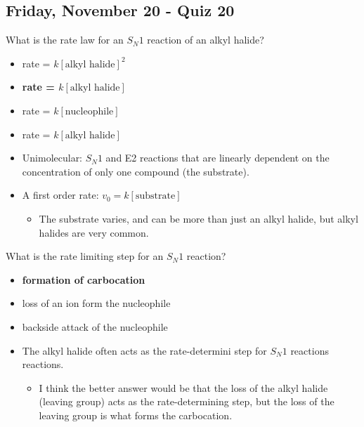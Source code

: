 \documentclass[12pt,a4paper]{article}
\begin{document}
\subsection{Friday, November 20 - Quiz 20}
\begin{enumerate}
    {\color{G-Moon}\item What is the rate law for an \(S_N1\) reaction of an alkyl halide?
    \begin{itemize}
        \item rate = \(k[\text{alkyl halide}]^2\)
        \item {\color{o-Sun}\textbf{ rate = \(k[\text{alkyl halide}]\)}}
        \item rate = \(k[\text{nucleophile}]\)
        \item rate = \(k[\text{alkyl halide}]\)
    \end{itemize}}
        \begin{itemize}
            \item Unimolecular: \(S_N1\) and E2 reactions that are linearly dependent on the concentration of only one compound (the substrate).
            \item A first order rate: \(v_0=k[\text{substrate}]\) 
                \begin{itemize}
                    \item The substrate varies, and can be more than just an alkyl halide, but alkyl halides are very common.
                \end{itemize}
        \end{itemize}
    {\color{G-Moon}\item What is the rate limiting step for an \(S_N1\) reaction?
    \begin{itemize}
        \item {\color{o-Sun}\textbf{formation of carbocation}}
        \item loss of an  ion form the nucleophile
        \item backside attack of the nucleophile
    \end{itemize}}
        \begin{itemize}
            \item The alkyl halide often acts as the rate-determini step for \(S_N1\) reactions reactions.
                \begin{itemize}
                    \item I think the better answer would be that the loss of the alkyl halide (leaving group) acts as the rate-determining step, but the loss of the leaving group is what forms the carbocation.

\end{itemize}
\end{itemize}
\end{enumerate}
\end{document}
